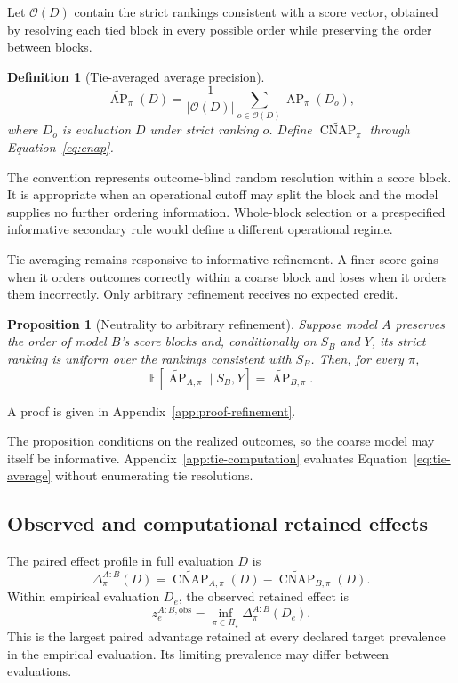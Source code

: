 \documentclass[11pt]{article}
\newcommand{\AP}{\operatorname{AP}}
\newcommand{\CNAP}{\operatorname{CNAP}}
\newcommand{\PSet}{\Pi_\star}
\newcommand{\E}{\mathbb{E}}
\newcommand{\APta}{\widetilde{\AP}}
\newcommand{\CNAPta}{\widetilde{\CNAP}}
\newtheorem{definition}{Definition}
\newtheorem{proposition}{Proposition}
\theoremstyle{remark}
\begin{document}
Let $\mathcal O(D)$ contain the strict rankings consistent with a score vector,
obtained by resolving each tied block in every possible order while preserving
the order between blocks.

\begin{definition}[Tie-averaged average precision]
\begin{equation}
\APta_\pi(D)
=
\frac{1}{|\mathcal O(D)|}
\sum_{o\in\mathcal O(D)}\AP_\pi(D_o),
\label{eq:tie-average}
\end{equation}
where $D_o$ is evaluation $D$ under strict ranking $o$. Define
$\CNAPta_\pi$ through Equation~\eqref{eq:cnap}.
\end{definition}

The convention represents outcome-blind random resolution within a score
block. It is appropriate when an operational cutoff may split the block and
the model supplies no further ordering information. Whole-block selection or
a prespecified informative secondary rule would define a different operational
regime.

Tie averaging remains responsive to informative refinement. A finer score
gains when it orders outcomes correctly within a coarse block and loses when it
orders them incorrectly. Only arbitrary refinement receives no expected
credit.

\begin{proposition}[Neutrality to arbitrary refinement]
\label{prop:refinement}
Suppose model $A$ preserves the order of model $B$'s score blocks and,
conditionally on $S_B$ and $Y$, its strict ranking is uniform over the rankings
consistent with $S_B$. Then, for every $\pi$,
\[
\E[\APta_{A,\pi}\mid S_B,Y]=\APta_{B,\pi}.
\]
\end{proposition}

A proof is given in Appendix~\ref{app:proof-refinement}.

The proposition conditions on the realized outcomes, so the coarse model may
itself be informative. Appendix~\ref{app:tie-computation} evaluates
Equation~\eqref{eq:tie-average} without enumerating tie resolutions.

\subsection{Observed and computational retained effects}

The paired effect profile in full evaluation $D$ is
\begin{equation}
\Delta^{A:B}_\pi(D)
=
\CNAPta_{A,\pi}(D)-\CNAPta_{B,\pi}(D).
\label{eq:paired-profile}
\end{equation}
Within empirical evaluation $D_e$, the observed retained effect is
\begin{equation}
z_e^{A:B,\mathrm{obs}}
=
\inf_{\pi\in\PSet}\Delta^{A:B}_\pi(D_e).
\label{eq:observed-retained}
\end{equation}
This is the largest paired advantage retained at every declared target
prevalence in the empirical evaluation. Its limiting prevalence may differ
between evaluations.
\end{document}
